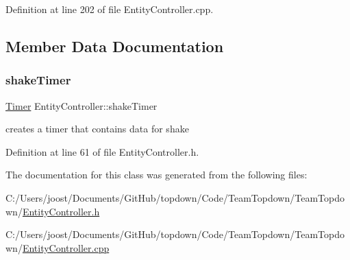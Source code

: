 Definition at line 202 of file Entity\+Controller.\+cpp.



\subsection{Member Data Documentation}
\mbox{\label{class_entity_controller_a05eb6c6b51a8628079e3c9432319f2b5}} 
\subsubsection{\texorpdfstring{shake\+Timer}{shakeTimer}}
{\footnotesize\ttfamily \hyperlink{struct_timer}{Timer} Entity\+Controller\+::shake\+Timer}

creates a timer that contains data for shake 

Definition at line 61 of file Entity\+Controller.\+h.



The documentation for this class was generated from the following files\+:\begin{DoxyCompactItemize}
\item 
C\+:/\+Users/joost/\+Documents/\+Git\+Hub/topdown/\+Code/\+Team\+Topdown/\+Team\+Topdown/\hyperlink{_entity_controller_8h}{Entity\+Controller.\+h}\item 
C\+:/\+Users/joost/\+Documents/\+Git\+Hub/topdown/\+Code/\+Team\+Topdown/\+Team\+Topdown/\hyperlink{_entity_controller_8cpp}{Entity\+Controller.\+cpp}\end{DoxyCompactItemize}
